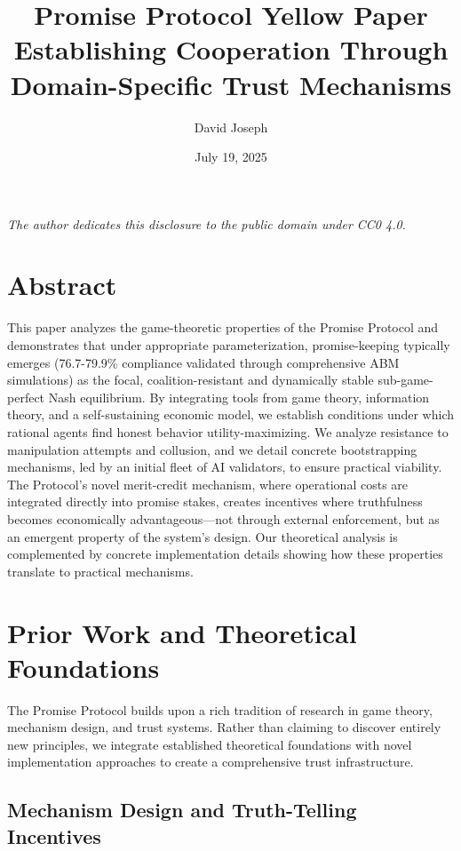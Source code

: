 \documentclass[11pt]{article}
\author{David Joseph}
\date{July 19, 2025}
\title{Promise Protocol Yellow Paper\\\medskip
\large Establishing Cooperation Through Domain-Specific Trust Mechanisms}
\begin{document}
\maketitle
\tableofcontents

\begin{center}
\emph{The author dedicates this disclosure to the public domain under CC0 4.0.}
\end{center}

\setcounter{tocdepth}{2}
\tableofcontents
\section{Abstract}
\label{sec:org1fdf788}
This paper analyzes the game-theoretic properties of the Promise Protocol and demonstrates that under appropriate parameterization, promise-keeping typically emerges (76.7-79.9\% compliance validated through comprehensive ABM simulations) as the focal, coalition-resistant and dynamically stable sub-game-perfect Nash equilibrium. By integrating tools from game theory, information theory, and a self-sustaining economic model, we establish conditions under which rational agents find honest behavior utility-maximizing. We analyze resistance to manipulation attempts and collusion, and we detail concrete bootstrapping mechanisms, led by an initial fleet of AI validators, to ensure practical viability. The Protocol's novel merit-credit mechanism, where operational costs are integrated directly into promise stakes, creates incentives where truthfulness becomes economically advantageous—not through external enforcement, but as an emergent property of the system's design. Our theoretical analysis is complemented by concrete implementation details showing how these properties translate to practical mechanisms.
\section{Prior Work and Theoretical Foundations}
\label{sec:orga3ab826}

The Promise Protocol builds upon a rich tradition of research in game theory, mechanism design, and trust systems. Rather than claiming to discover entirely new principles, we integrate established theoretical foundations with novel implementation approaches to create a comprehensive trust infrastructure.
\subsection{Mechanism Design and Truth-Telling Incentives}
\label{sec:org82c1185}
\end{document}
